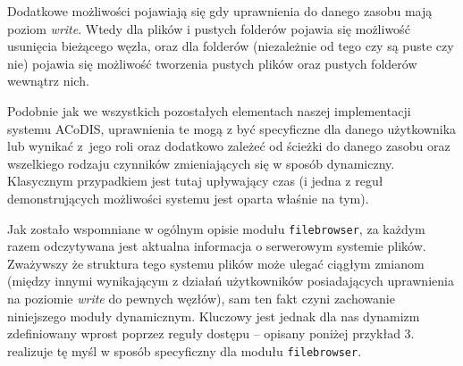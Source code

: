 \documentclass{classrep}
\begin{document}
Dodatkowe możliwości pojawiają się gdy uprawnienia do danego zasobu mają poziom \emph{write}.
Wtedy dla plików i pustych folderów pojawia się możliwość usunięcia bieżącego węzła,
oraz dla folderów (niezależnie od tego czy są puste czy nie) pojawia się możliwość
tworzenia pustych plików oraz pustych folderów wewnątrz nich.

Podobnie jak we wszystkich pozostałych elementach naszej implementacji systemu ACoDIS, uprawnienia
te mogą z być specyficzne dla danego użytkownika lub wynikać z~jego roli oraz dodatkowo
zależeć od ścieżki do danego zasobu oraz wszelkiego rodzaju czynników zmieniających
się w sposób dynamiczny. Klasycznym przypadkiem jest tutaj upływający czas (i jedna z reguł
demonstrujących możliwości systemu jest oparta właśnie na tym).

Jak zostało wspomniane w ogólnym opisie modułu \texttt{filebrowser}, za każdym
razem odczytywana jest aktualna informacja o serwerowym systemie plików.
Zważywszy że struktura tego systemu plików może ulegać ciągłym zmianom
(między innymi wynikającym z działań użytkowników posiadających uprawnienia
na poziomie \emph{write} do pewnych węzłów), sam ten fakt czyni zachowanie
niniejszego moduły dynamicznym. Kluczowy jest jednak dla nas dynamizm
zdefiniowany wprost poprzez reguły dostępu -- opisany poniżej przykład 3. realizuje
tę myśl w sposób specyficzny dla modułu \texttt{filebrowser}.
\end{document}
